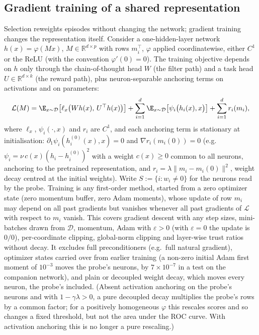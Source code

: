 \subsection{Gradient training of a shared representation}

Selection reweights episodes without changing the network; gradient training changes the representation itself. Consider a one-hidden-layer network $h(x) = \varphi(Mx)$, $M \in \mathbb{R}^{d \times p}$ with rows $m_i^\top$, $\varphi$ applied coordinatewise, either $C^1$ or the ReLU (with the convention $\varphi'(0) = 0$). The training objective depends on $h$ only through the chain-of-thought head $W$ (the filter path) and a task head $U \in \mathbb{R}^{d \times k}$ (the reward path), plus neuron-separable anchoring terms on activations and on parameters:
\begin{equation}\label{eq:train-objective}
  \mathcal{L}(M) = \E_{x \sim \mathcal{D}}\big[\ell_x\big(W h(x),\, U^\top h(x)\big)\big] + \sum_{i=1}^d \E_{x \sim \mathcal{D}}\big[\psi_i\big(h_i(x), x\big)\big] + \sum_{i=1}^d r_i(m_i),
\end{equation}
where $\ell_x$, $\psi_i(\cdot, x)$ and $r_i$ are $C^1$, and each anchoring term is stationary at initialisation: $\partial_1 \psi_i(h_i^{(0)}(x), x) = 0$ and $\nabla r_i(m_i(0)) = 0$ (e.g.\ $\psi_i = \nu\, c(x) (h_i - h_i^{(0)})^2$ with a weight $c(x) \ge 0$ common to all neurons, anchoring to the pretrained representation, and $r_i = \lambda \|m_i - m_i(0)\|^2$, weight decay centred at the initial weights). Write $S := \{i : w_i \neq 0\}$ for the neurons read by the probe. Training is any first-order method, started from a zero optimizer state (zero momentum buffer, zero Adam moments), whose update of row $m_i$ may depend on all past gradients but vanishes whenever all past gradients of $\mathcal{L}$ with respect to $m_i$ vanish. This covers gradient descent with any step sizes, mini-batches drawn from $\mathcal{D}$, momentum, Adam with $\varepsilon > 0$ (with $\varepsilon = 0$ the update is $0/0$), per-coordinate clipping, global-norm clipping and layer-wise trust ratios without decay. It excludes full preconditioners (e.g.\ full natural gradient), optimizer states carried over from earlier training (a non-zero initial Adam first moment of $10^{-3}$ moves the probe's neurons, by $7 \times 10^{-7}$ in a test on the companion network), and plain or decoupled weight decay, which moves every neuron, the probe's included. (Absent activation anchoring on the probe's neurons and with $1 - \gamma\lambda > 0$, a pure decoupled decay multiplies the probe's rows by a common factor; for a positively homogeneous $\varphi$ this rescales scores and so changes a fixed threshold, but not the area under the ROC curve. With activation anchoring this is no longer a pure rescaling.)

